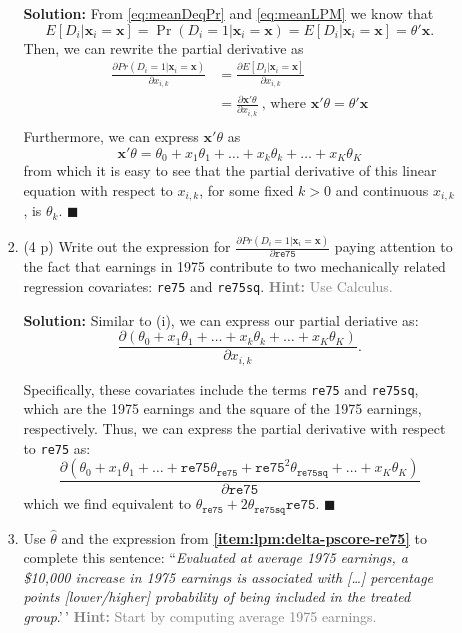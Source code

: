 \documentclass[
]{article}
\begin{document}
\begin{enumerate}
\begin{enumerate}
\begin{enumerate}
      \textbf{Solution:} From \ref{eq:meanDeqPr} and \ref{eq:meanLPM} we
      know that
      \[E[D_i|\mathbf{x}_i=\mathbf{x}]=\Pr(D_i=1|\mathbf{x}_i=\mathbf{x}) = E[D_i|\mathbf{x}_i=\mathbf{x}]=\theta'\mathbf{x}.\]
      Then, we can rewrite the partial derivative as \begin{align*}
       \frac{\partial Pr(D_i=1|\mathbf{x}_{i}=\mathbf{x})}{\partial x_{i,k}} &= \frac{\partial E[D_i|\mathbf{x}_{i}=\mathbf{x}]}{\partial x_{i,k}} \\
       &= \frac{\partial \mathbf{x}'\theta}{\partial x_{i,k}} \ \text{, where $\mathbf{x}'\theta = \theta'\mathbf{x}$}\\ 
       \end{align*} Furthermore, we can express \(\mathbf{x}'\theta\) as
      \[\mathbf{x}'\theta = \theta_0 + x_1 \theta_1 + \ldots + x_k \theta_k + \ldots + x_K \theta_K\]
      from which it is easy to see that the partial derivative of this
      linear equation with respect to \(x_{i,k}\), for some fixed
      \(k > 0\) and continuous \(x_{i, k}\), is \(\theta_k\).
      \hfill \(\blacksquare\) \newline
    \item
      (4 p) Write out the expression for
      \(\frac{\partial Pr(D_i=1|\mathbf{x}_{i}=\mathbf{x})}{\partial \texttt{re75}}\)
      paying attention to the fact that earnings in 1975 contribute to
      two mechanically related regression covariates: \texttt{re75} and
      \texttt{re75sq}.
      \textcolor{gray}{\textbf{Hint:} Use Calculus.}\label{item:lpm:delta-pscore-re75}

      \textbf{Solution:} Similar to (i), we can express our partial
      deriative as:
      \[\frac{\partial (\theta_0 + x_1 \theta_1 + \ldots + x_k \theta_k + \ldots + x_K \theta_K)}{\partial x_{i,k}}.\]

      Specifically, these covariates include the terms \texttt{re75} and
      \texttt{re75sq}, which are the 1975 earnings and the square of the
      1975 earnings, respectively. Thus, we can express the partial
      derivative with respect to \texttt{re75} as:
      \[\frac{\partial (\theta_0 + x_1 \theta_1 + \ldots + \texttt{re75} \theta_{\texttt{re75}} + \texttt{re75}^2 \theta_{\texttt{re75sq}} + \ldots + x_K \theta_K)}{\partial \texttt{re75}}\]
      which we find equivalent to
      \(\theta_{\texttt{re75}} + 2\theta_{\texttt{re75sq}}\texttt{re75}\).
      \hfill \(\blacksquare\) \newline
    \item
      Use \(\hat{\theta}\) and the expression from
      \textbf{\ref{item:lpm:delta-pscore-re75}} to complete this
      sentence:
      ``\textit{Evaluated at average 1975 earnings, a \$10,000 increase in 1975 earnings is associated with [\dots] percentage points [lower/higher] probability of being included in the treated group}.'\,'
      \textcolor{gray}{\textbf{Hint:} Start by computing average 1975 earnings.}


\end{enumerate}
\end{enumerate}
\end{enumerate}
\end{document}

